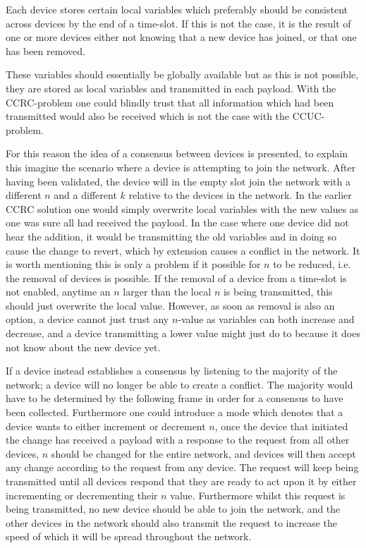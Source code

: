 Each device stores certain local variables which preferably should be consistent across devices by the end of a time-slot.
If this is not the case, it is the result of one or more devices either not knowing that a new device has joined, or that one has been removed.

These variables should essentially be globally available but as this is not possible, they are stored as local variables and transmitted in each payload.
With the CCRC-problem one could blindly trust that all information which had been transmitted would also be received which is not the case with the CCUC-problem.

\bigskip \noindent
For this reason the idea of a consensus between devices is presented, to explain this imagine the scenario where a device is attempting to join the network.
After having been validated, the device will in the empty slot join the network with a different $n$ and a different $k$ relative to the devices in the network.
In the earlier CCRC solution one would simply overwrite local variables with the new values as one was sure all had received the payload.
In the case where one device did not hear the addition, it would be transmitting the old variables and in doing so cause the change to revert, which by extension causes a conflict in the network.
It is worth mentioning this is only a problem if it possible for $n$ to be reduced, i.e. the removal of devices is possible.
If the removal of a device from a time-slot is not enabled, anytime an $n$ larger than the local $n$ is being transmitted, this should just overwrite the local value. 
However, as soon as removal is also an option, a device cannot just trust any $n$-value as variables can both increase and decrease, and a device transmitting a lower value might just do to because it does not know about the new device yet.

If a device instead establishes a consensus by listening to the majority of the network; a device will no longer be able to create a conflict.
The majority would have to be determined by the following frame in order for a consensus to have been collected.
Furthermore one could introduce a mode which denotes that a device wants to either increment or decrement $n$, once the device that initiated the change has received a payload with a response to the request from all other devices, $n$ should be changed for the entire network, and devices will then accept any change according to the request from any device.
The request will keep being transmitted until all devices respond that they are ready to act upon it by either incrementing or decrementing their $n$ value.
Furthermore whilst this request is being transmitted, no new device should be able to join the network, and the other devices in the network should also transmit the request to increase the speed of which it will be spread throughout the network.